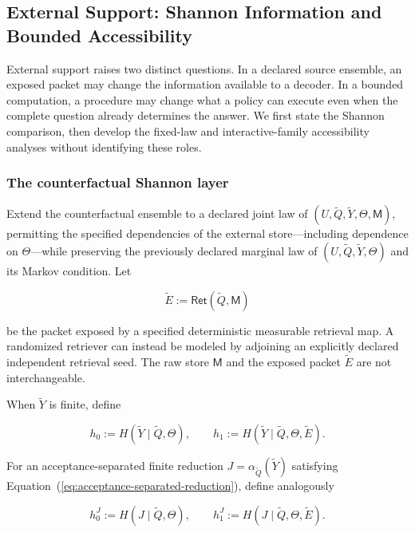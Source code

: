 \documentclass[10pt]{article} %
\renewcommand{\eqref}[1]{\textup{(\ref{#1})}}
\providecommand{\1}{\mathbf{1}}  %
\theoremstyle{remark}
\theoremstyle{definition}
\begin{document}
\subsection{External Support: Shannon Information and Bounded Accessibility}
\label{subsec:external-support-accessibility}

External support raises two distinct questions. In a declared source
ensemble, an exposed packet may change the information available to a
decoder. In a bounded computation, a procedure may change what a policy can
execute even when the complete question already determines the answer.
We first state the Shannon comparison, then develop the fixed-law and
interactive-family accessibility analyses without identifying these roles.

\subsubsection{The counterfactual Shannon layer}

Extend the counterfactual ensemble to a declared joint law of $(U,\widetilde Q,\widetilde Y,\Theta,\mathsf M)$, permitting the specified dependencies of the external store---including dependence on $\Theta$---while preserving the previously declared marginal law of $(U,\widetilde Q,\widetilde Y,\Theta)$ and its Markov condition. Let

\begin{equation}
\widetilde E
:=
\mathsf{Ret}(\widetilde Q,\mathsf M)
\label{eq:retrieved-packet}
\end{equation}

be the packet exposed by a specified deterministic measurable retrieval map. A randomized retriever can instead be modeled by adjoining an explicitly declared independent retrieval seed. The raw store $\mathsf M$ and the exposed packet $\widetilde E$ are not interchangeable.

When $\widetilde Y$ is finite, define

\begin{equation}
h_0
:=
H(\widetilde Y\mid\widetilde Q,\Theta),
\qquad
h_1
:=
H(\widetilde Y\mid\widetilde Q,\Theta,\widetilde E).
\label{eq:external-support-residuals}
\end{equation}

For an acceptance-separated finite reduction $J=\alpha_{\widetilde Q}(\widetilde Y)$ satisfying Equation~\eqref{eq:acceptance-separated-reduction}, define analogously

\begin{equation}
h_0^J
:=
H(J\mid\widetilde Q,\Theta),
\qquad
h_1^J
:=
H(J\mid\widetilde Q,\Theta,\widetilde E).
\label{eq:external-support-packed-residuals}
\end{equation}
\end{document}
